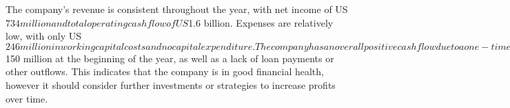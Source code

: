

The company's revenue is consistent throughout the year, with net income of US$734 million and total operating cash flow of US$1.6 billion. Expenses are relatively low, with only US$246 million in working capital costs and no capital expenditure. The company has an overall positive cash flow due to a one-time investment of US$150 million at the beginning of the year, as well as a lack of loan payments or other outflows. This indicates that the company is in good financial health, however it should consider further investments or strategies to increase profits over time.
